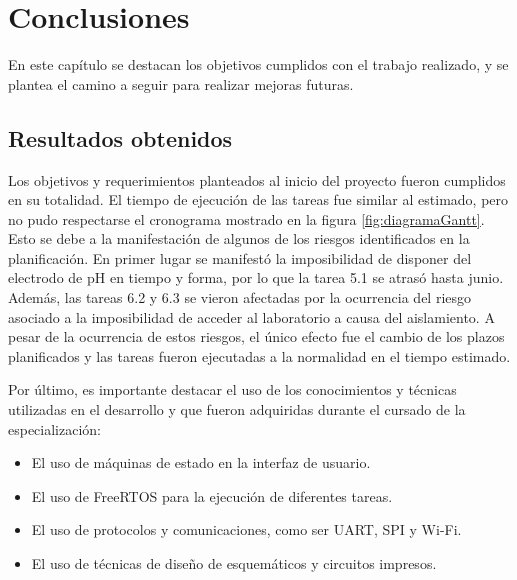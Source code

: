 
\chapter{Conclusiones} %

\label{Chapter5} %



En este capítulo se destacan los objetivos cumplidos con el trabajo realizado, y se plantea el camino a seguir para realizar mejoras futuras.


\section{Resultados obtenidos }

Los objetivos y requerimientos planteados al inicio del proyecto fueron cumplidos en su totalidad. El tiempo de ejecución de las tareas fue similar al estimado, pero no pudo respectarse el cronograma mostrado en la figura \ref{fig:diagramaGantt}. Esto se debe a la manifestación de algunos de los riesgos identificados en la planificación. En primer lugar se manifestó la imposibilidad de disponer del electrodo de pH en tiempo y forma, por lo que la tarea 5.1 se atrasó hasta junio. Además, las tareas 6.2 y 6.3 se vieron afectadas por la ocurrencia del riesgo asociado a la imposibilidad de acceder al laboratorio a causa del aislamiento. A pesar de la ocurrencia de estos riesgos, el único efecto fue el cambio de los plazos planificados y las tareas fueron ejecutadas a la normalidad en el tiempo estimado.

Por último, es importante destacar el uso de los conocimientos y técnicas utilizadas en el desarrollo y que fueron adquiridas durante el cursado de la especialización:
\begin{itemize}
 \item El uso de máquinas de estado en la interfaz de usuario.
 \item El uso de FreeRTOS para la ejecución de diferentes tareas.
 \item El uso de protocolos y comunicaciones, como ser UART, SPI y Wi-Fi.
 \item El uso de técnicas de diseño de esquemáticos y circuitos impresos.
\end{itemize}

